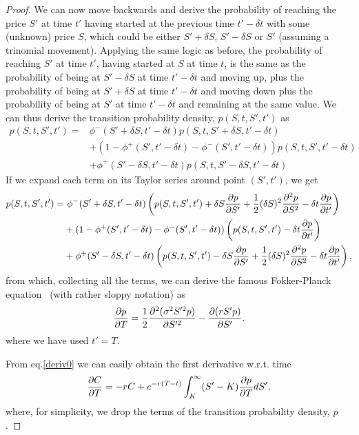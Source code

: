 \begin{proof}
We can now move backwards and derive the probability of reaching the price $S'$ at time $t'$ having started at the previous time $t'-\delta t$ with some (unknown) price $S$, which could be either $S'+\delta S$, $S'-\delta S$ or $S'$ (assuming a trinomial movement). Applying the same logic as before, the probability of reaching $S'$ at time $t'$, having started at $S$ at time $t$, is the same as the probability of being at $S'-\delta S$ at time $t'-\delta t$ and moving up, plus the probability of being at $S'+\delta S$ at time $t'-\delta t$ and moving down plus the probability of being at $S'$ at time $t'-\delta t$ and remaining at the same value. We can thus derive the transition probability density, $ p(S,t,S',t')$ as
\begin{equation}
\begin{split}
p(S,t,S',t')=&\phi^-(S'+\delta S,t'-\delta t)p(S,t,S'+\delta S,t'-\delta t)\\
&+(1-\phi^+(S',t'-\delta t)-\phi^-(S',t'-\delta t))p(S,t,S',t'-\delta t)\\
&+\phi^+(S'-\delta S,t'-\delta t)p(S,t,S'-\delta S,t'-\delta t)
\end{split}
\end{equation}
\noindent If we expand each term on its Taylor series around point $(S',t')$, we get
\begin{equation}
\begin{split}
p(S,t,S',t')=&\ \phi^-(S'+\delta S,t'-\delta t)\left(p(S,t,S',t')+\delta S\pdv{p}{S'}+\frac{1}{2}(\delta S)^2\pdv{^2p}{S^2}-\delta t\pdv{p}{t'}\right)\\
&+(1-\phi^+(S',t'-\delta t)-\phi^-(S',t'-\delta t))\left(p(S,t,S',t')-\delta t\pdv{p}{t'}\right)\\
&+\phi^+(S'-\delta S,t'-\delta t)\left(p(S,t,S',t')-\delta S\pdv{p}{S'}+\frac{1}{2}(\delta S)^2\pdv{^2p}{S^2}-\delta t\pdv{p}{t'}\right),
\end{split}
\end{equation}
\noindent from which, collecting all the terms, we can derive the famous Fokker-Planck equation~\citep{Wilmott3} (with rather sloppy notation) as
\begin{equation}\label{FokkerPlanck}
\pdv{p}{T}=\frac{1}{2}\pdv{^2(\sigma^2S'^2p)}{S'^2}-\pdv{(rS'p)}{S'}.
\end{equation}
\noindent where we have used $t'=T$.


From eq.\eqref{deriv0} we can easily obtain the first derivative w.r.t. time
\begin{equation}
\pdv{C}{T}=-rC+e^{-r(T-t)}\int_K^\infty(S'-K)\pdv{p}{T}dS',
\end{equation}
\noindent where, for simplicity, we drop the terms of the transition probability density, $p$.


\end{proof}
